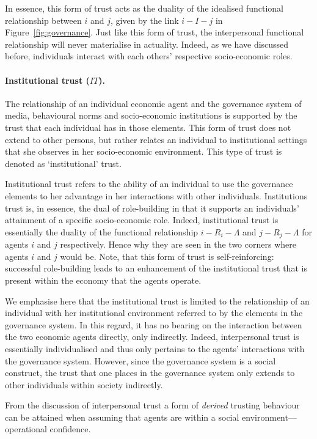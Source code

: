 \begin{subappendices}
In essence, this form of trust acts as the duality of the idealised functional relationship between $i$ and $j$, given by the link $i-I-j$ in Figure~\ref{fig:governance}. Just like this form of trust, the interpersonal functional relationship will never materialise in actuality. Indeed, as we have discussed before, individuals interact with each others' respective socio-economic roles.

\paragraph{Institutional trust ($IT$).}

The relationship of an individual economic agent and the governance system of media, behavioural norms and socio-economic institutions is supported by the trust that each individual has in those elements. This form of trust does not extend to other persons, but rather relates an individual to institutional settings that she observes in her socio-economic environment. This type of trust is denoted as `institutional' trust.

Institutional trust refers to the ability of an individual to use the governance elements to her advantage in her interactions with other individuals. Institutions trust is, in essence, the dual of role-building in that it supports an individuals' attainment of a specific socio-economic role. Indeed, institutional trust is essentially the duality of the functional relationship $i-R_{i}-\Lambda$ and $j-R_{j}-\Lambda$ for agents $i$ and $j$ respectively. Hence why they are seen in the two corners where agents $i$ and $j$ would be. Note, that this form of trust is self-reinforcing: successful role-building leads to an enhancement of the institutional trust that is present within the economy that the agents operate.

We emphasise here that the institutional trust is limited to the relationship of an individual with her institutional environment referred to by the elements in the governance system. In this regard, it has no bearing on the interaction between the two economic agents directly, only indirectly. Indeed, interpersonal trust is essentially individualised and thus only pertains to the agents' interactions with the governance system. However, since the governance system is a social construct, the trust that one places in the governance system only extends to other individuals within society indirectly.

From the discussion of interpersonal trust a form of \textit{derived} trusting behaviour can be attained when assuming that agents are within a social environment---operational confidence.


\end{subappendices}
